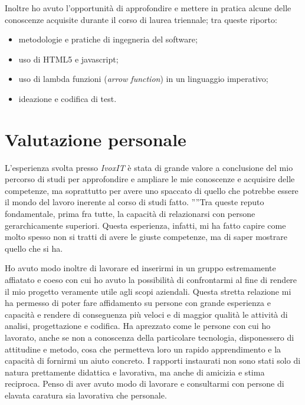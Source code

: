 Inoltre ho avuto l'opportunità di approfondire e mettere in pratica alcune delle conoscenze acquisite durante il corso di laurea triennale; tra queste riporto:
\begin{itemize}
    \item metodologie e pratiche di ingegneria del software;
    \item uso di HTML5 e javascript;
    \item uso di lambda funzioni (\emph{arrow function}) in un linguaggio imperativo;
    \item ideazione e codifica di test.
\end{itemize}


\section{Valutazione personale}
L'esperienza svolta presso \emph{IvoxIT} è stata di grande valore a conclusione del mio percorso di studi per approfondire e ampliare le mie conoscenze e acquisire delle competenze, ma soprattutto per avere uno spaccato di quello che potrebbe essere il mondo del lavoro inerente al corso di studi fatto. ''''Tra queste reputo fondamentale, prima fra tutte, la capacità di relazionarsi con persone gerarchicamente superiori. Questa esperienza, infatti, mi ha fatto capire come molto spesso non si tratti di avere le giuste competenze, ma di saper mostrare quello che si ha.

Ho avuto modo inoltre di lavorare ed inserirmi in un gruppo estremamente affiatato e coeso con cui ho avuto la possibilità di confrontarmi al fine di rendere il mio progetto veramente utile agli scopi aziendali. Questa stretta relazione mi ha permesso di poter fare affidamento su persone con grande esperienza e capacità e rendere di conseguenza più veloci e di maggior qualità le attività di analisi, progettazione e codifica. Ha aprezzato come le persone con cui ho lavorato, anche se non a conoscenza della particolare tecnologia, disponessero di attitudine e metodo, cosa che permetteva loro un rapido apprendimento e la capacità di fornirmi un aiuto concreto. I rapporti instaurati non sono stati solo di natura prettamente didattica e lavorativa, ma anche di amicizia e stima reciproca. Penso di aver avuto modo di lavorare e consultarmi con persone di elavata caratura sia lavorativa che personale. 

